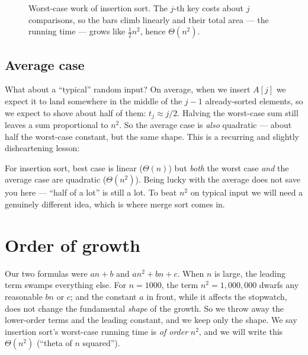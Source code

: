\begin{figure}[H]
\centering
{}
\caption{Worst-case work of insertion sort. The $j$-th key costs about $j$ comparisons,
so the bars climb linearly and their total area --- the running time --- grows like
$\tfrac12 n^2$, hence $\Theta(n^2)$.}
\label{ch02:fig-triangle}
\end{figure}

\subsection{Average case}

What about a ``typical'' random input? On average, when we insert $A[j]$ we expect it
to land somewhere in the middle of the $j-1$ already-sorted elements, so we expect to
shove about half of them: $t_j \approx j/2$. Halving the worst-case sum still leaves a
sum proportional to $n^2$. So the average case is \emph{also} quadratic --- about half
the worst-case constant, but the same shape. This is a recurring and slightly
disheartening lesson:

\begin{focusbox}
For insertion sort, best case is linear ($\Theta(n)$) but \emph{both} the worst case
\emph{and} the average case are quadratic ($\Theta(n^2)$). Being lucky with the average
does not save you here --- ``half of a lot'' is still a lot. To beat $n^2$ on typical
input we will need a genuinely different idea, which is where merge sort comes in.
\end{focusbox}

\section{Order of growth}

Our two formulas were $an + b$ and $an^2 + bn + c$. When $n$
is large, the leading term swamps everything else. For $n = 1000$, the term $n^2 =
1{,}000{,}000$ dwarfs any reasonable $bn$ or $c$; and the constant $a$ in front, while
it affects the stopwatch, does not change the fundamental \emph{shape} of the growth.
So we throw away the lower-order terms and the leading constant, and we keep only the
shape. We say insertion sort's worst-case running time is \emph{of order} $n^2$, and we
will write this $\Theta(n^2)$ (``theta of $n$ squared'').

